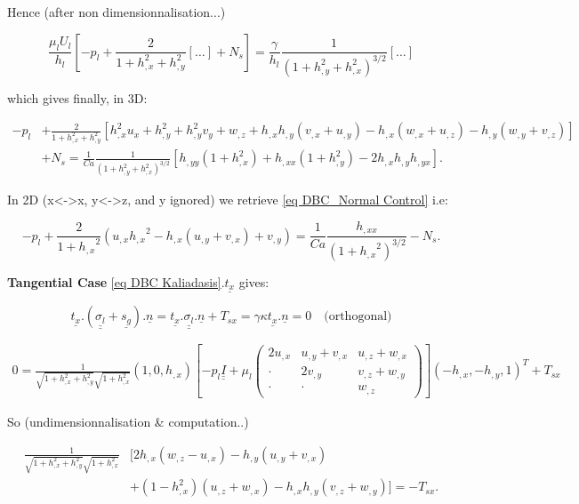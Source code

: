 \documentclass[12pt]{article}
\begin{document}
Hence (after non dimensionnalisation...)

$$\frac{\mu_lU_l}{h_l}\left[-p_l+\frac{2}{1+h_{,x}^2+h_{,y}^2}[\dots]+N_s\right]=\frac{\gamma}{h_l}\frac{1}{(1+h_{,y}^2+h_{,x}^2)^{3/2}}[\dots]$$

which gives finally, in 3D:

\begin{equation}
\begin{aligned}
-p_l &+\frac{2}{1+h_{,x}^2+h_{,y}^2}[h_{,x}^2u_x+h_{,y}^2+h_{,y}^2v_y+w_{,z}+h_{,x}h_{,y}(v_{,x}+u_{,y})-h_{,x}(w_{,x}+u_{,z})-h_{,y}(w_{,y}+v_{,z})]\\
&+N_s =\frac{1}{Ca}\frac{1}{(1+h_{,y}^2+h_{,x}^2)^{3/2}}[h_{,yy}(1+h_{,x}^2)+h_{,xx}(1+h_{,y}^2)-2h_{,x}h_{,y}h_{,yx}].
\end{aligned}
\end{equation}

In 2D (x<->x, y<->z, and y ignored) we retrieve \ref{eq DBC_Normal Control} i.e:

$$-p_l + \frac{2}{1+{h_{,x}}^2}(u_{,x}{h_{,x}}^2 - h_{,x}(u_{,y} + v_{,x})+v_{,y}) = \frac{1}{Ca} \frac{h_{,xx}}{(1+{h_{,x}}^2)^{3/2}}-N_s.
$$


\textbf{Tangential Case}
\ref{eq DBC Kaliadasis}.$\underline{t_x}$ gives: 

$$\underline{t_x}.(\underline{\underline{\sigma_l}}+\underline{s_g}).\underline{n}= \underline{t_x}.\underline{\underline{\sigma_l}}.\underline{n}+T_{sx}=\gamma\kappa\underline{t_x}.\underline{n}=0 \quad \text{(orthogonal)}$$

\begin{align*}
0 = \frac{1}{\sqrt{1+h_{,x}^2+h_{,y}^2}\sqrt{1+h_{,x}^2}}(1, 0, h_{,x})\left[ -p_l\underline{\underline{I}} + \mu_l\begin{pmatrix}
2u_{,x} & u_{,y}+v_{,x} & u_{,z}+w_{,x} \\
\cdot & 2v_{,y} & v_{,z}+w_{,y} \\
\cdot & \cdot & w_{,z}
\end{pmatrix} \right](-h_{,x}, -h_{,y}, 1)^T+T_{sx}
\end{align*}

So (undimensionnalisation \& computation..)


\begin{align*}
    \frac{1}{\sqrt{1+h_{,x}^2+h_{,y}^2}\sqrt{1+h_{,x}^2}} &\Big[
        2h_{,x}(w_{,z}-u_{,x})-h_{,y}(u_{,y}+v_{,x})\\
    &+(1-h_{,x}^2)(u_{,z}+w_{,x}) -h_{,x}h_{,y}(v_{,z}+w_{,y}) \Big]
    = -T_{sx}.
\end{align*}
\end{document}
